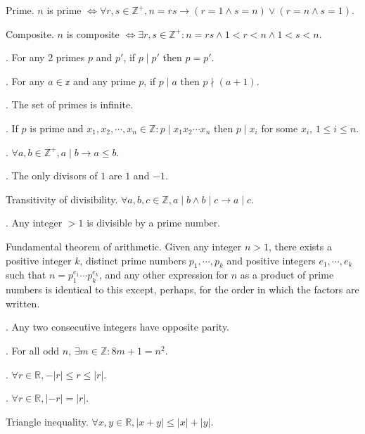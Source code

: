 \documentclass{slnotes}
\begin{document}
 Prime. \(n\) is prime \(\Leftrightarrow \forall r, s \in \mathbb{Z}^+, n = rs \to (r = 1 \land s = n) \lor (r = n \land s = 1)\).

 Composite. \(n\) is composite \(\Leftrightarrow \exists r, s \in \mathbb{Z}^+ : n = rs \land 1 < r < n \land 1 < s < n\).

. For any 2 primes \(p\) and \(p'\), if \(p \mid p'\) then \(p = p'\).

. For any \(a \in \mathbb{z}\) and any prime \(p\), if \(p \mid a\) then \(p \nmid (a + 1)\).

. The set of primes is infinite.

. If \(p\) is prime and \(x_1, x_2, \cdots, x_n \in \mathbb{Z} : p \mid x_1x_2\cdots x_n\) then \(p \mid x_i\) for some \(x_i\), \(1 \le i \le n\).

. \(\forall a, b \in \mathbb{Z}^+, a \mid b \to a \le b\).

. The only divisors of \(1\) are \(1\) and \(-1\).

 Transitivity of divisibility. \(\forall a,b,c \in \mathbb{Z}, a \mid b \land b \mid c \to a \mid c\).

. Any integer \(> 1\) is divisible by a prime number.

 Fundamental theorem of arithmetic. Given any integer \(n > 1\), there exists a positive integer \(k\), distinct prime numbers \(p_1, \cdots, p_k\) and positive integers \(e_1, \cdots, e_k\) such that \(n = p_1^{e_1}\cdots p_k^{e_k}\), and any other expression for \(n\) as a product of prime numbers is identical to this except, perhaps, for the order in which the factors are written.

. Any two consecutive integers have opposite parity.

. For all odd \(n\), \(\exists m \in \mathbb{Z} : 8m + 1 = n^2\).

. \(\forall r \in \mathbb{R}, -\lvert r \rvert \le r \le \lvert r \rvert\).

. \(\forall r \in \mathbb{R}, \lvert -r \rvert = \lvert r \rvert\).

 Triangle inequality. \(\forall x,y \in \mathbb{R}, \lvert x+y \rvert \leq \lvert x \rvert + \lvert y \rvert\).
\end{document}
